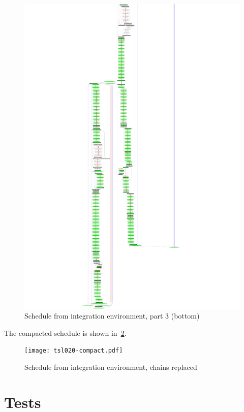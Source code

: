 \documentclass[12pt,a4paper]{report}
\begin{document}
    \begin{figure}
        \centering
        \includegraphics*[width=1.0\textwidth,keepaspectratio]{tsl020-3.pdf}
        \caption{Schedule from integration environment, part 3 (bottom)}
        \label{fig:tsl020-3}
    \end{figure}
The compacted schedule is shown in~\ref{fig:tsl020-compact}.
    \begin{figure}
        \centering
        \texttt{[image: tsl020-compact.pdf]}
        \caption{Schedule from integration environment, chains replaced}
        \label{fig:tsl020-compact}
    \end{figure}


\chapter{Tests}
\end{document}

